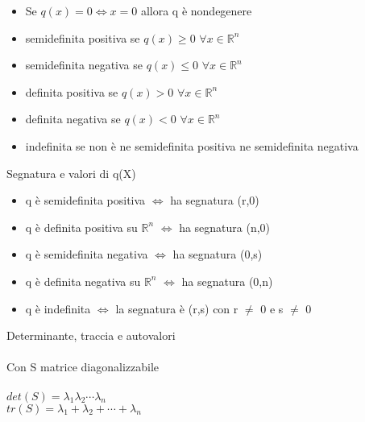 \documentclass{article}
\begin{document}
\begin{itemize}
    \item Se \(q(x)=0 \iff x=0 \) allora q è nondegenere
    \item semidefinita positiva se \(q(x)\ge 0\)  \(\forall x\in \mathbb{R}^n\)
    \item semidefinita negativa se \(q(x)\le 0\)  \(\forall x\in \mathbb{R}^n\)
    \item definita positiva se \(q(x)> 0\)  \(\forall x\in \mathbb{R}^n\)
    \item definita negativa se \(q(x)< 0\)  \(\forall x\in \mathbb{R}^n\)
    \item indefinita se non è ne semidefinita positiva ne semidefinita negativa
\end{itemize}
{\large Segnatura e valori di q(X)}
\begin{itemize}
    \item q è semidefinita positiva \(\iff\) ha segnatura (r,0)
    \item q è definita positiva su \(\mathbb{R}^n\) \(\iff\) ha segnatura (n,0)
    \item q è semidefinita negativa \(\iff\) ha segnatura (0,s)
    \item q è definita negativa su \(\mathbb{R}^n\) \(\iff\) ha segnatura (0,n)
    \item q è indefinita \(\iff\) la segnatura è (r,s) con r \(\ne\) 0 e s \(\ne\) 0  
\end{itemize}
{\large Determinante, traccia e autovalori}\\\\
Con S matrice diagonalizzabile\\\\
\(det(S)= \lambda_1\lambda_2\cdots\lambda_n\)\\
\(tr(S)= \lambda_1+\lambda_2+\cdots+\lambda_n\)
\end{document}
